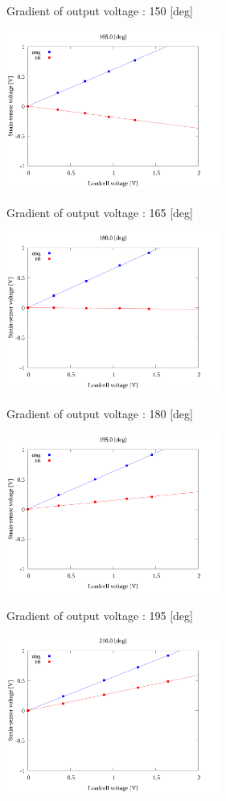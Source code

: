 \begin{multicols}{2}
\begin{figure_here}
\begin{center}
            \caption{Gradient of output voltage : 150 [deg]}
            \includegraphics[width=70mm]{../../02_workspace/result/2-1/plot/04/04_linear_1650.png}
            \caption{Gradient of output voltage : 165 [deg]}
            \includegraphics[width=70mm]{../../02_workspace/result/2-1/plot/04/04_linear_1800.png}
            \caption{Gradient of output voltage : 180 [deg]}
            \includegraphics[width=70mm]{../../02_workspace/result/2-1/plot/04/04_linear_1950.png}
            \caption{Gradient of output voltage : 195 [deg]}
            \includegraphics[width=70mm]{../../02_workspace/result/2-1/plot/04/04_linear_2100.png}

\end{center}
\end{figure_here}
\end{multicols}
